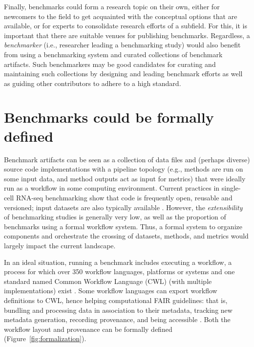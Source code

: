 \documentclass[11pt]{article}
\begin{document}
Finally, benchmarks could form a research topic on their own, either for newcomers to the field to get acquainted with the conceptual options that are available, or for experts to consolidate research efforts of a subfield. For this, it is important that there are suitable venues for publishing benchmarks. Regardless, a \emph{benchmarker} (i.e., researcher leading a benchmarking study) would also benefit from using a benchmarking system and curated collections of benchmark artifacts. Such benchmarkers may be good candidates for curating and maintaining such collections by designing and leading benchmark efforts as well as guiding other contributors to adhere to a high standard. 

\section*{Benchmarks could be formally defined}

Benchmark artifacts can be seen as a collection of data files and (perhaps diverse) source code implementations with a pipeline topology (e.g., methods are run on some input data, and method outputs act as input for metrics) that were ideally run as a workflow in some computing environment. Current practices in single-cell RNA-seq benchmarking show that code is frequently open, reusable and versioned; input datasets are also typically available \cite{Sonrel2023-te}. However, the \textit{extensibility} of benchmarking studies is generally very low, as well as the proportion of benchmarks using a formal workflow system. Thus, a formal system to organize components and orchestrate the crossing of datasets, methods, and metrics would largely impact the current landscape.

In an ideal situation, running a benchmark includes executing a workflow, a process for which over 350 workflow languages, platforms or systems  \cite{Wratten2021-el, Amstutz2024-qk} and one standard named Common Workflow Language (CWL) (with multiple implementations) exist \cite{Amstutz2016-vo}. Some workflow languages can export workflow definitions to CWL, hence helping computational FAIR guidelines: that is, bundling and processing data in association to their metadata, tracking new metadata generation, recording provenance, and being accessible \cite{Goble2020-ps}. Both the workflow layout and provenance can be formally defined (Figure~\ref{fig:formalization}). 
\end{document}
